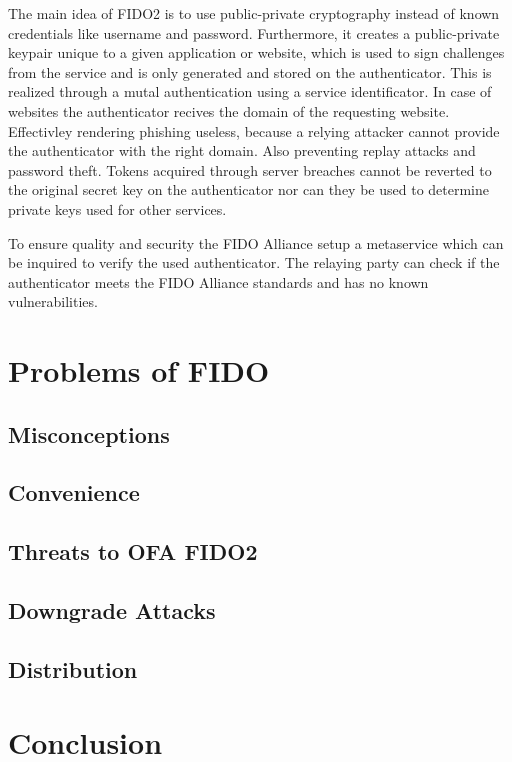 \documentclass[runningheads]{llncs}
\begin{document}
The main idea of FIDO2 is to use public-private cryptography instead of known credentials like username and password. Furthermore, it creates a public-private keypair unique to a given application or website, which is used to sign challenges from the service and is only generated and stored on the authenticator. This is realized through a mutal authentication using a service identificator. In case of websites the authenticator recives the domain of the requesting website. Effectivley rendering phishing useless, because a relying attacker cannot provide the authenticator with the right domain.\cite{274610} Also preventing replay attacks and password theft. Tokens acquired through server breaches cannot be reverted to the original secret key on the authenticator nor can they be used to determine private keys used for other services.

To ensure quality and security the FIDO Alliance setup a metaservice which can be inquired to verify the used authenticator. The relaying party can check if the authenticator meets the FIDO Alliance standards and has no known vulnerabilities.\cite{9099190}
\section{Problems of FIDO}
\subsection{Misconceptions}
\subsection{Convenience}
\subsection{Threats to OFA FIDO2}
\subsection{Downgrade Attacks}
\subsection{Distribution}
\section{Conclusion}


\end{document}
